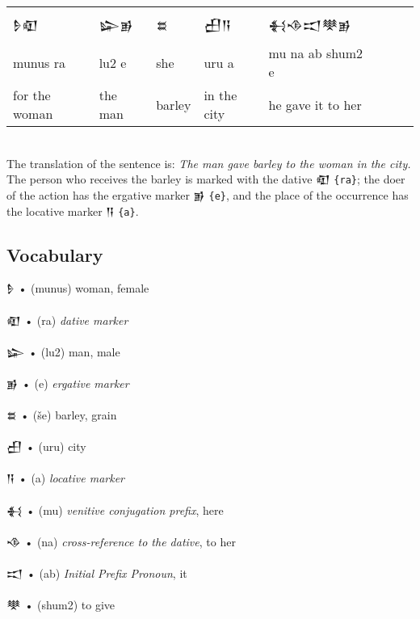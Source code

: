 \documentclass[a4paper,12pt]{book}
\newcommand{\fcn}{\setmainfont{Akkadian.otf}}
\begin{document}
\noindent
\begin{tabular}[!h]{l l l l l l l l}
  \fcn\Large 𒊩𒊏 &\fcn\Large 𒇽𒂊 &\fcn\Large 𒊺
  &\fcn\Large 𒌷𒀀 &\fcn\Large 𒈬𒈾𒀊𒋧𒂊\\
  munus ra & lu2 e & she & uru a & mu na ab shum2 e\\
  for the woman & the man & barley & in the city
  & he gave it to her\\
\end{tabular}\verb||\\

The translation of the sentence is: {\em
The man gave barley to the woman in the city.}
The person who receives the barley is
marked with the dative {\fcn 𒊏} \verb|{ra}|;
the doer of the action has the ergative
marker {\fcn 𒂊} \verb|{e}|, and the
place of the occurrence has the locative
marker {\fcn 𒀀} \verb|{a}|.

\newpage
\subsection*{Vocabulary}
{\fcn\Large 𒊩} • (munus) woman, female\\
\verb||\\
{\fcn\Large 𒊏} • (ra) {\em dative marker}\\
\verb||\\
{\fcn\Large 𒇽} • (lu2) man, male\\
\verb||\\
{\fcn\Large 𒂊} • (e) {\em ergative marker}\\
\verb||\\
{\fcn\Large 𒊺} • (še) barley, grain\\
\verb||\\
{\fcn\Large 𒌷} • (uru) city\\
\verb||\\
{\fcn\Large 𒀀} • (a) {\em locative marker}\\
\verb||\\
{\fcn\Large 𒈬} • (mu) {\em venitive conjugation prefix}, here\\
\verb||\\
{\fcn\Large 𒈾} • (na) {\em cross-reference to
the dative}, to her\\
\verb||\\
{\fcn\Large 𒀊} • (ab) {\em Initial Prefix Pronoun}, it\\
\verb||\\
{\fcn\Large 𒋧} • (shum2) to give\\

\newpage
\end{document}
